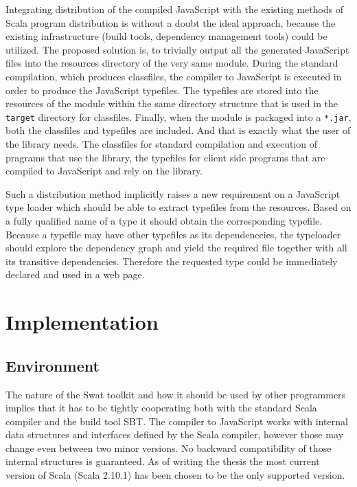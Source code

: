 \documentclass[12pt,a4paper]{report}
\begin{document}
Integrating distribution of the compiled JavaScript with the existing methods of Scala program distribution is without a doubt the ideal approach, because the existing infrastructure (build tools, dependency management tools) could be utilized. The proposed solution is, to trivially output all the generated JavaScript files into the resources directory of the very same module. During the standard compilation, which produces classfiles, the compiler to JavaScript is executed in order to produce the JavaScript typefiles. The typefiles are stored into the resources of the module within the same directory structure that is used in the \texttt{target} directory for classfiles. Finally, when the module is packaged into a \texttt{*.jar}, both the classfiles and typefiles are included. And that is exactly what the user of the library needs. The classfiles for standard compilation and execution of pragrams that use the library, the typefiles for client side programs that are compiled to JavaScript and rely on the library.

Such a distribution method implicitly raises a new requirement on a JavaScript type loader which should be able to extract typefiles from the resources. Based on a fully qualified name of a type it should obtain the corresponding typefile. Because a typefile may have other typefiles as its dependenecies, the typeloader should explore the dependency graph and yield the required file together with all its transitive dependencies. Therefore the requested type could be immediately declared and used in a web page.



\chapter{Implementation}

\section{Environment}

The nature of the Swat toolkit and how it should be used by other programmers implies that it has to be tightly cooperating both with the standard Scala compiler and the build tool SBT. The compiler to JavaScript works with internal data structures and interfaces defined by the Scala compiler, however those may change even between two minor versions. No backward compatibility of those internal structures is guaranteed. As of writing the thesis the most current version of Scala (Scala 2.10.1) has been chosen to be the only supported version. 
\end{document}
